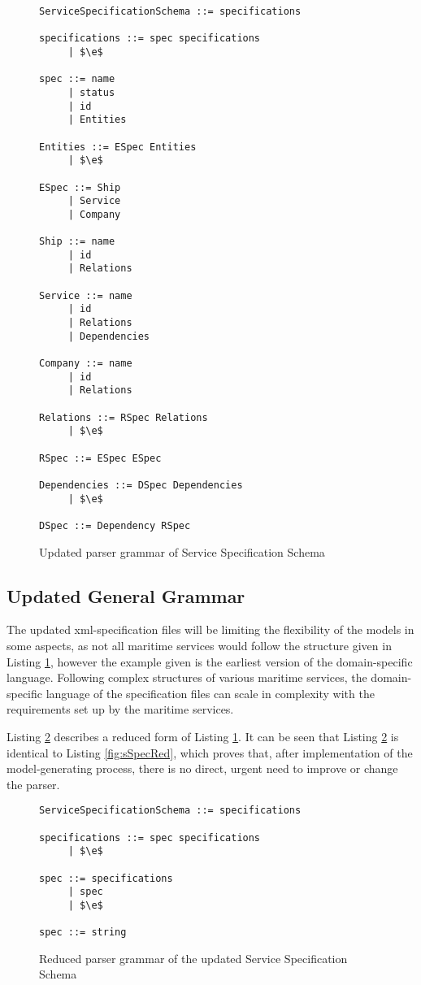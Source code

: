 \begin{figure}
	\centering
	\begin{lstlisting}[keywordstyle={}]
ServiceSpecificationSchema ::= specifications

specifications ::= spec specifications
     | $\e$
     
spec ::= name
     | status
     | id
     | Entities

Entities ::= ESpec Entities
     | $\e$

ESpec ::= Ship
     | Service
     | Company

Ship ::= name
     | id
     | Relations

Service ::= name
     | id
     | Relations
     | Dependencies

Company ::= name
     | id
     | Relations

Relations ::= RSpec Relations
     | $\e$

RSpec ::= ESpec ESpec

Dependencies ::= DSpec Dependencies
     | $\e$

DSpec ::= Dependency RSpec
	\end{lstlisting}
	\caption{Updated parser grammar of Service Specification Schema}
	\label{fig:sSpecUpd}
\end{figure}
\subsection{Updated General Grammar}
The updated xml-specification files will be limiting the flexibility of the models in some aspects, as not all maritime services would follow the structure given in Listing \ref{fig:sSpecUpd}, however the example given is the earliest version of the domain-specific language. Following complex structures of various maritime services, the domain-specific language of the specification files can scale in complexity with the requirements set up by the maritime services.

Listing \ref{fig:sSpecUpdRed} describes a reduced form of Listing \ref{fig:sSpecUpd}. It can be seen that Listing \ref{fig:sSpecUpdRed} is identical to Listing \ref{fig:sSpecRed}, which proves that, after implementation of the model-generating process, there is no direct, urgent need to improve or change the parser.

\begin{figure}
	\centering
	\begin{lstlisting}[keywordstyle={}]
ServiceSpecificationSchema ::= specifications

specifications ::= spec specifications
     | $\e$
     
spec ::= specifications
     | spec
     | $\e$

spec ::= string
	\end{lstlisting}
	\caption{Reduced parser grammar of the updated Service Specification Schema}
	\label{fig:sSpecUpdRed}
\end{figure}

